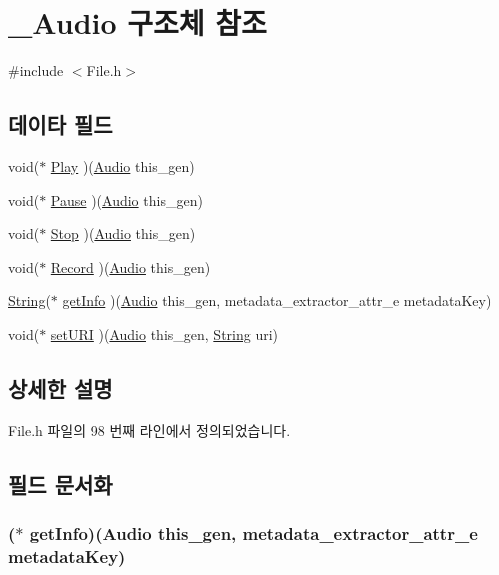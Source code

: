 \hypertarget{struct___audio}{\section{\-\_\-\-Audio 구조체 참조}
\label{struct___audio}
}


{\ttfamily \#include $<$File.\-h$>$}

\subsection*{데이타 필드}
\begin{DoxyCompactItemize}
\item 
void($\ast$ \hyperlink{struct___audio_a406855bb5ad50dfefae012be99b06cde}{Play} )(\hyperlink{_file_8h_a37d3938964971e2cb1ed957c60f7a5b9}{Audio} this\-\_\-gen)
\item 
void($\ast$ \hyperlink{struct___audio_a3d78751cda929e033894cbd9f552ae8e}{Pause} )(\hyperlink{_file_8h_a37d3938964971e2cb1ed957c60f7a5b9}{Audio} this\-\_\-gen)
\item 
void($\ast$ \hyperlink{struct___audio_a04a848082fe555df88ae9bc35f4223d3}{Stop} )(\hyperlink{_file_8h_a37d3938964971e2cb1ed957c60f7a5b9}{Audio} this\-\_\-gen)
\item 
void($\ast$ \hyperlink{struct___audio_abcf52f46187e6c2e2fbc5bd8512adad1}{Record} )(\hyperlink{_file_8h_a37d3938964971e2cb1ed957c60f7a5b9}{Audio} this\-\_\-gen)
\item 
\hyperlink{dit_8h_a2efe6d463d80744789f228f5dc4baa39}{String}($\ast$ \hyperlink{struct___audio_af557af230def744c4b3ed69d5b3c2076}{get\-Info} )(\hyperlink{_file_8h_a37d3938964971e2cb1ed957c60f7a5b9}{Audio} this\-\_\-gen, metadata\-\_\-extractor\-\_\-attr\-\_\-e metadata\-Key)
\item 
void($\ast$ \hyperlink{struct___audio_a1c40fa54cdb34775aeb35430f5901990}{set\-U\-R\-I} )(\hyperlink{_file_8h_a37d3938964971e2cb1ed957c60f7a5b9}{Audio} this\-\_\-gen, \hyperlink{dit_8h_a2efe6d463d80744789f228f5dc4baa39}{String} uri)
\end{DoxyCompactItemize}


\subsection{상세한 설명}


File.\-h 파일의 98 번째 라인에서 정의되었습니다.



\subsection{필드 문서화}
\hypertarget{struct___audio_af557af230def744c4b3ed69d5b3c2076}{
\subsubsection[{get\-Info}]{($\ast$  get\-Info)({\bf Audio} this\-\_\-gen, metadata\-\_\-extractor\-\_\-attr\-\_\-e metadata\-Key)}}\label{struct___audio_af557af230def744c4b3ed69d5b3c2076}


